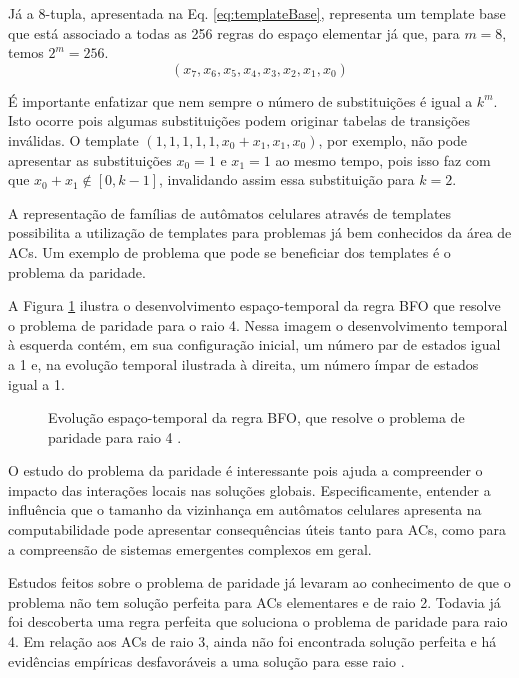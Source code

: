 Já a $8$-tupla, apresentada na Eq. \eqref{eq:templateBase}, representa um template base que está associado a todas as 256 regras do espaço elementar já que, para $m = 8$, temos $2^m = 256 $.
\begin{equation}
(x_7,x_6,x_5,x_4,x_3,x_2,x_1,x_0)
\label{eq:templateBase}
\end{equation}

É importante enfatizar que nem sempre o número de substituições é igual a $k^m$. Isto ocorre pois algumas substituições podem originar tabelas de transições inválidas. O template $(1,1,1,1,1,x_0+x_1,x_1,x_0)$, por exemplo, não pode apresentar as substituições $x_0=1$ e $x_1=1$ ao mesmo tempo, pois isso faz com que $x_0 + x_1 \notin [0, k-1]$, invalidando assim essa substituição para $k=2$.

A representação de famílias de autômatos celulares através de templates possibilita a utilização de templates para problemas já bem conhecidos da área de ACs. Um exemplo de problema que pode se beneficiar dos templates é o problema da paridade.

A Figura \ref{fig:parity-rule} ilustra o desenvolvimento espaço-temporal da regra BFO \cite{Betel2013} que resolve o problema de paridade para o raio 4. Nessa imagem o desenvolvimento temporal à esquerda contém, em sua configuração inicial, um número par de estados igual a 1 e, na evolução temporal ilustrada à direita, um número ímpar de estados igual a 1.

\begin{figure}[h!]
\center
{}
\qquad
{}
\caption{Evolução espaço-temporal da regra BFO, que resolve o problema de paridade para raio 4 \cite{Betel2013}.}
\label{fig:parity-rule}
\end{figure}

O estudo do problema da paridade é interessante pois ajuda a compreender o impacto das interações locais nas soluções globais. Especificamente, entender a influência que o tamanho da vizinhança em autômatos celulares apresenta na computabilidade pode apresentar consequências úteis tanto para ACs, como para a compreensão de sistemas emergentes complexos em geral.

Estudos feitos sobre o problema de paridade já levaram ao conhecimento de que o problema não tem solução perfeita para ACs elementares e de raio 2. Todavia já foi descoberta uma regra perfeita que soluciona o problema de paridade para raio 4. Em relação aos ACs de raio 3, ainda não foi encontrada solução perfeita e há evidências empíricas desfavoráveis a uma solução para esse raio \cite{Betel2013}.

